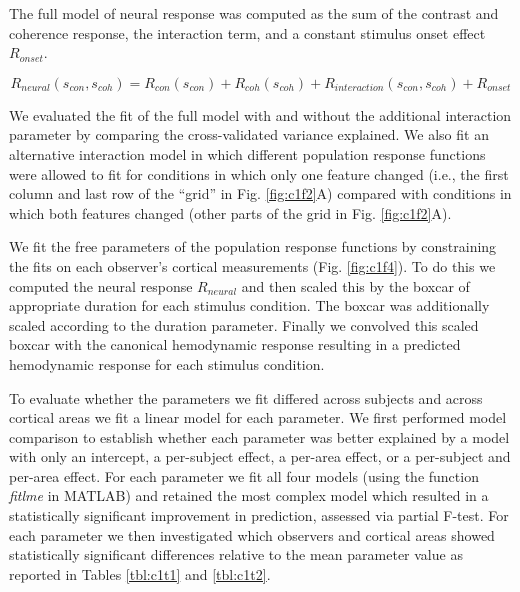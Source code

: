 \documentclass{report}
\begin{document}
The full model of neural response was computed as the sum of the contrast and coherence response, the interaction term, and a constant stimulus onset effect $R_{onset}$.

\begin{equation}
    R_{neural}(s_{con},s_{coh})=R_{con}(s_{con})+R_{coh}(s_{coh})+R_{interaction}(s_{con},s_{coh})+R_{onset}
\end{equation}

We evaluated the fit of the full model with and without the additional interaction parameter by comparing the cross-validated variance explained. We also fit an alternative interaction model in which different population response functions were allowed to fit for conditions in which only one feature changed (i.e., the first column and last row of the “grid” in Fig. \ref{fig:c1f2}A) compared with conditions in which both features changed (other parts of the grid in Fig. \ref{fig:c1f2}A).

We fit the free parameters of the population response functions by constraining the fits on each observer’s cortical measurements (Fig. \ref{fig:c1f4}). To do this we computed the neural response $R_{neural}$ and then scaled this by the boxcar of appropriate duration for each stimulus condition. The boxcar was additionally scaled according to the duration parameter. Finally we convolved this scaled boxcar with the canonical hemodynamic response resulting in a predicted hemodynamic response for each stimulus condition.

To evaluate whether the parameters we fit differed across subjects and across cortical areas we fit a linear model for each parameter. We first performed model comparison to establish whether each parameter was better explained by a model with only an intercept, a per-subject effect, a per-area effect, or a per-subject and per-area effect. For each parameter we fit all four models (using the function \textit{fitlme} in MATLAB) and retained the most complex model which resulted in a statistically significant improvement in prediction, assessed via partial F-test. For each parameter we then investigated which observers and cortical areas showed statistically significant differences relative to the mean parameter value as reported in Tables \ref{tbl:c1t1} and \ref{tbl:c1t2}.
\end{document}
